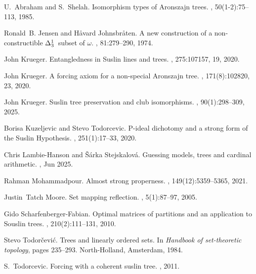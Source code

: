 \documentclass{amsart}
\theoremstyle{definition}
\begin{document}

\begin{thebibliography}{}

U.~Abraham and S.~Shelah.
\newblock Isomorphism types of {A}ronszajn trees.
, 50(1-2):75--113, 1985.

Ronald~B. Jensen and H{\r a}vard Johnsbr{\r a}ten.
\newblock A new construction of a non-constructible {$\Delta\sb{3}\sp{1}$}\
  subset of {$\omega $}.
, 81:279--290, 1974.

John Krueger.
\newblock Entangledness in {S}uslin lines and trees.
, 275:107157, 19, 2020.

John Krueger.
\newblock A forcing axiom for a non-special {A}ronszajn tree.
, 171(8):102820, 23, 2020.

John Krueger.
\newblock Suslin tree preservation and club isomorphisms.
, 90(1):298--309, 2025.

Borisa Kuzeljevic and Stevo Todorcevic.
\newblock P-ideal dichotomy and a strong form of the {S}uslin {H}ypothesis.
\newblock {\em Fund. Math.}, 251(1):17--33, 2020.

Chris Lambie-Hanson and {\v{S}}{\'a}rka Stejskalov{\'a}.
\newblock Guessing models, trees and cardinal arithmetic.
, Jun 2025.

Rahman Mohammadpour.
\newblock Almost strong properness.
, 149(12):5359--5365, 2021.

Justin~Tatch Moore.
\newblock Set mapping reflection.
, 5(1):87--97, 2005.

Gido Scharfenberger-Fabian.
\newblock Optimal matrices of partitions and an application to {S}ouslin trees.
\newblock {\em Fund. Math.}, 210(2):111--131, 2010.

Stevo Todor\v{c}evi\'c.
\newblock Trees and linearly ordered sets.
\newblock In {\em Handbook of set-theoretic topology}, pages 235--293.
  North-Holland, Amsterdam, 1984.

S.~Todorcevic.
\newblock Forcing with a coherent suslin tree.
, 2011.

\end{thebibliography}
\end{document}
